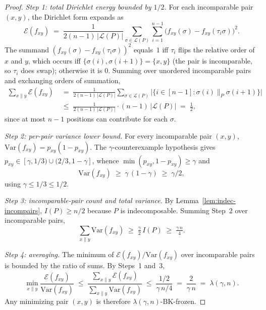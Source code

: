 \begin{proof}
\emph{Step 1: total Dirichlet energy bounded by $1/2$.}
For each incomparable pair $(x,y)$, the Dirichlet form expands as
\[
  \mathcal{E}(f_{xy})
  \;=\; \frac{1}{2(n-1)\,|\mathcal L(P)|}
  \sum_{\sigma \in \mathcal L(P)}\sum_{i=1}^{n-1}
  \bigl(f_{xy}(\sigma) - f_{xy}(\tau_i\sigma)\bigr)^2.
\]
The summand $(f_{xy}(\sigma) - f_{xy}(\tau_i\sigma))^2$ equals~$1$ iff
$\tau_i$ flips the relative order of $x$ and $y$, which occurs iff
$\{\sigma(i), \sigma(i+1)\} = \{x,y\}$ (the pair is incomparable, so
$\tau_i$ does swap); otherwise it is $0$. Summing over unordered
incomparable pairs and exchanging orders of summation,
\begin{align*}
  \sum_{x \parallel y} \mathcal{E}(f_{xy})
  &\;=\;
  \frac{1}{2(n-1)\,|\mathcal L(P)|}
  \sum_{\sigma \in \mathcal L(P)}
  \bigl|\bigl\{i \in [n-1] : \sigma(i) \parallel_P \sigma(i+1)
  \bigr\}\bigr| \\
  &\;\le\;
  \frac{1}{2(n-1)\,|\mathcal L(P)|} \cdot (n-1)\,|\mathcal L(P)|
  \;=\; \tfrac{1}{2},
\end{align*}
since at most $n-1$ positions can contribute for each $\sigma$.

\emph{Step 2: per-pair variance lower bound.}
For every incomparable pair $(x,y)$,
$\mathrm{Var}(f_{xy}) = p_{xy}(1 - p_{xy})$. The
$\gamma$-counterexample hypothesis gives
$p_{xy} \in [\gamma, 1/3) \cup (2/3, 1-\gamma]$, whence
$\min(p_{xy}, 1-p_{xy}) \ge \gamma$ and
\[
  \mathrm{Var}(f_{xy})
  \;\ge\; \gamma\,(1-\gamma)
  \;\ge\; \gamma/2,
\]
using $\gamma \le 1/3 \le 1/2$.

\emph{Step 3: incomparable-pair count and total variance.}
By Lemma~\ref{lem:indec-incompairs}, $I(P) \ge n/2$ because $P$ is
indecomposable. Summing Step~2 over incomparable pairs,
\[
  \sum_{x \parallel y} \mathrm{Var}(f_{xy})
  \;\ge\; \tfrac{\gamma}{2}\, I(P)
  \;\ge\; \tfrac{\gamma\, n}{4}.
\]

\emph{Step 4: averaging.}
The minimum of $\mathcal{E}(f_{xy})/\mathrm{Var}(f_{xy})$ over
incomparable pairs is bounded by the ratio of sums. By Steps~1
and~3,
\[
  \min_{x \parallel y}
    \frac{\mathcal{E}(f_{xy})}{\mathrm{Var}(f_{xy})}
  \;\le\;
  \frac{\sum_{x \parallel y} \mathcal{E}(f_{xy})}
       {\sum_{x \parallel y} \mathrm{Var}(f_{xy})}
  \;\le\;
  \frac{1/2}{\gamma\, n / 4}
  \;=\; \frac{2}{\gamma\, n}
  \;=\; \lambda(\gamma, n).
\]
Any minimizing pair $(x,y)$ is therefore $\lambda(\gamma, n)$-BK-frozen.
\end{proof}

